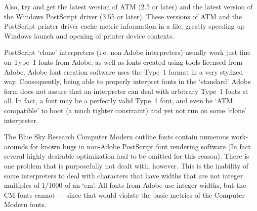 
Also, try and get the latest version of ATM (2.5 or later)
and the latest version of the Windows PostScript driver 
(3.55 or later).  
These versions of ATM and the PostScript printer driver
cache metric information in a file, greatly speeding up Windows launch
and opening of printer device contexts. %



PostScript `clone' interpreters (i.e. non-Adobe interpreters)
usually work just fine on Type~1 fonts from
Adobe, as well as fonts created using tools licensed from Adobe.  
Adobe font creation software %
uses the Type~1 format in a very stylized way.  
Consequently, being able to properly interpret fonts in the `standard'
Adobe form does not assure that an interpreter can deal with arbitrary Type~1
fonts at all.  In fact, a font may be a perfectly valid Type~1 font, and even
be `ATM compatible' to boot (a much tighter constraint) and yet not run on
some `clone' interpreter.

The Blue Sky Research Computer Modern outline fonts contain numerous
work-arounds for known bugs in non-Adobe PostScript font rendering software
(In fact several highly desirable optimization had to be omitted for
this reason). 
There is one problem %
that is purposefully not dealt with, however.  
This is the inability of some interpreters to deal with characters that have
widths that are not integer multiples of 1/1000 of an `em'.  All fonts from
Adobe use integer widths, but the CM fonts cannot --- since that would
violate the basic metrics of the Computer Modern fonts.

